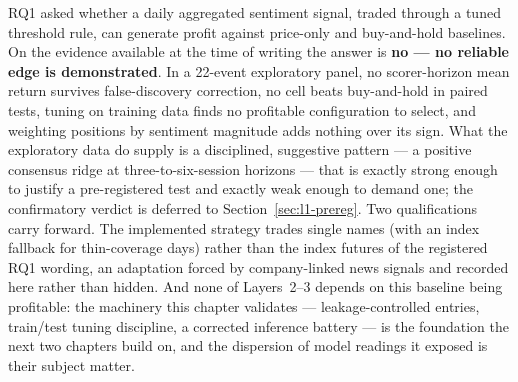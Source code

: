 RQ1 asked whether a daily aggregated sentiment signal, traded through
a tuned threshold rule, can generate profit against price-only and
buy-and-hold baselines. On the evidence available at the time of
writing the answer is \textbf{no --- no reliable edge is
demonstrated}. In a 22-event exploratory panel, no scorer-horizon mean
return survives false-discovery correction, no cell beats buy-and-hold
in paired tests, tuning on training data finds no profitable
configuration to select, and weighting positions by sentiment
magnitude adds nothing over its sign. What the exploratory data do
supply is a disciplined, suggestive pattern --- a positive consensus
ridge at three-to-six-session horizons --- that is exactly strong
enough to justify a pre-registered test and exactly weak enough to
demand one; the confirmatory verdict is deferred to
Section~\ref{sec:l1-prereg}. Two qualifications carry forward. The
implemented strategy trades single names (with an index fallback for
thin-coverage days) rather than the index futures of the registered
RQ1 wording, an adaptation forced by company-linked news signals and
recorded here rather than hidden. And none of Layers~2--3 depends on
this baseline being profitable: the machinery this chapter validates
--- leakage-controlled entries, train/test tuning discipline, a
corrected inference battery --- is the foundation the next two
chapters build on, and the dispersion of model readings it exposed is
their subject matter.
